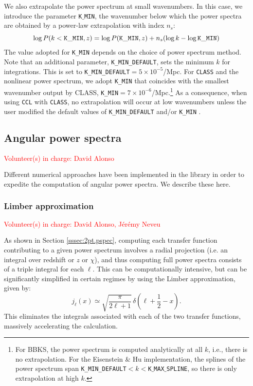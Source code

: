 \documentclass[\docopts]{\docclass}
\newcommand{\vol}[1]{\textcolor{red}{Volunteer(s) in charge: #1}}
\begin{document}
We also extrapolate the power spectrum at small wavenumbers. In this case, we introduce the parameter {\tt K$\_$MIN}, the wavenumber below which the power spectra are obtained by a power-law extrapolation with index $n_s$:
\begin{equation}
  \log P(k<{\tt K\_MIN},z) = \log P({\tt K\_MIN},z) + n_s (\log k-\log{\tt K\_MIN})
\end{equation}
The value adopted for {\tt K\_MIN} depends on the choice of power spectrum method. Note that an additional parameter, {\tt K\_MIN\_DEFAULT}, sets the minimum $k$ for integrations. This is set to {\tt K\_MIN\_DEFAULT}$=5\times 10^{-5}$/Mpc. For {\tt CLASS} and the nonlinear power spectrum, we adopt {\tt K\_MIN} that coincides with the smallest wavenumber output by CLASS, {\tt K\_MIN}$=7\times 10^{-6}$/Mpc.\footnote{For BBKS, the power spectrum is computed analytically at all $k$, i.e., there is no extrapolation. For the Eisenstein \& Hu implementation, the splines of the power spectrum span {\tt K\_MIN\_DEFAULT}$<k<${\tt K$\_$MAX$\_$SPLINE}, so there is only extrapolation at high $k$.} As a consequence, when using {\tt CCL} with {\tt CLASS}, no extrapolation will occur at low wavenumbers unless the user modified the default values of {\tt K\_MIN\_DEFAULT} and/or {\tt K\_MIN} .

\subsection{Angular power spectra}
\vol{David Alonso}

Different numerical approaches have been implemented in the library in order to expedite the computation of angular power spectra. We describe these here.

\subsubsection{Limber approximation}
\vol{David Alonso, J\'er\'emy Neveu}


As shown in Section \ref{sssec:2pt.pspec}, computing each transfer function contributing to a given power spectrum involves a radial projection (i.e. an integral over redshift or $z$ or $\chi$), and thus computing full power spectra consists of a triple integral for each $\ell$. This can be computationally intensive, but can be significantly simplified in certain regimes by using the Limber approximation, given by:
\begin{equation}
 j_\ell(x)\simeq\sqrt{\frac{\pi}{2\ell+1}}\,\delta\left(\ell+\frac{1}{2}-x\right).
\end{equation}
This eliminates the integrals associated with each of the two transfer functions, massively accelerating the calculation.
\end{document}
